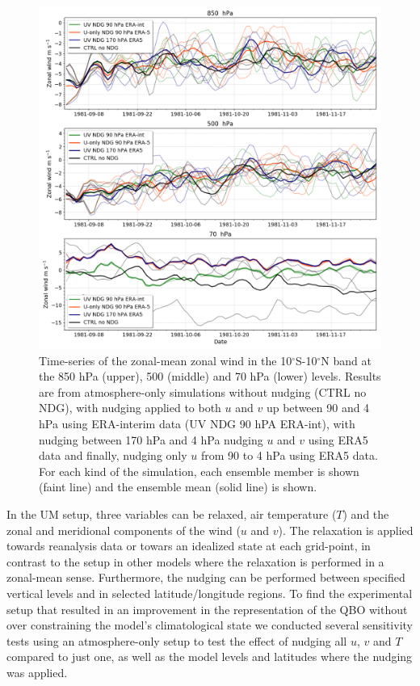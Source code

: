 \begin{figure}[t!]
\centering
 \includegraphics[width=0.95\linewidth]{figures/u_test__.png}
\caption[Time-series of zonal-mean winds under different nudging conditions]{Time-series of the zonal-mean zonal wind in the 10$^\circ$S-10$^\circ$N band at the 850 hPa (upper), 500 (middle) and 70 hPa (lower) levels. Results are from atmosphere-only simulations without nudging (CTRL no NDG), with nudging applied to both $u$ and $v$ up between 90 and 4 hPa using ERA-interim data (UV NDG 90 hPA ERA-int), with nudging between 170 hPa and 4 hPa nudging $u$ and $v$ using ERA5 data and finally, nudging only $u$ from 90 to 4 hPa using ERA5 data. For each kind of the simulation, each ensemble member is shown (faint line) and the ensemble mean (solid line) is shown. }
\label{fig:u_nudg_stv}
\end{figure}

In the UM setup, three variables can be relaxed, air temperature ($T$) and the zonal and meridional components of the wind ($u$ and $v$). The relaxation is applied towards reanalysis data or towars an idealized state at each grid-point, in contrast to the setup in other models \citep[e.g.][]{martin2021} where the relaxation is performed in a zonal-mean sense.
 Furthermore, the nudging can be performed between specified vertical levels and in selected latitude/longitude regions. %
 To find the experimental setup that resulted in an improvement in the representation of the QBO without over constraining the model's climatological state we conducted several sensitivity tests using an atmosphere-only setup to test the effect of nudging all $u$, $v$ and $T$ compared to just one, as well as the model levels and latitudes where the nudging was applied. 


